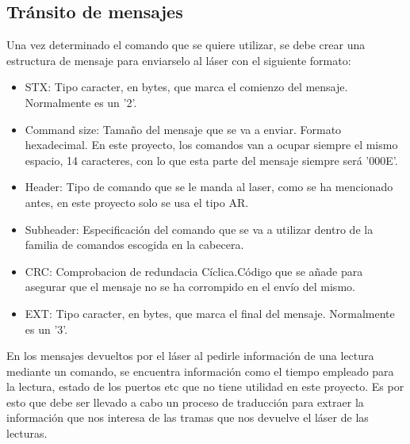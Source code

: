 \subsection{Tránsito de mensajes}
Una vez determinado el comando que se quiere utilizar, se debe crear una estructura de mensaje para enviarselo al láser con el siguiente formato:
\begin{itemize}
	\item STX: Tipo caracter, en bytes, que marca el comienzo del mensaje. Normalmente es un '2'.
 	\item Command size: Tamaño del mensaje que se va a enviar. Formato hexadecimal. En este proyecto, los comandos van a ocupar siempre el mismo espacio, 14 caracteres, con lo que esta parte del mensaje siempre será '000E'.
 	\item Header: Tipo de comando que se le manda al laser, como se ha mencionado antes, en este proyecto solo se usa el tipo AR.
 	\item Subheader: Especificación del comando que se va a utilizar dentro de la familia de comandos escogida en la cabecera.
 	\item CRC:  Comprobacion de redundacia Cíclica.Código que se añade para asegurar que el mensaje no se ha corrompido en el envío del mismo. 
 	\item EXT: Tipo caracter, en bytes, que marca el final del mensaje. Normalmente es un '3'.
 \end{itemize}

En los mensajes devueltos por el láser al pedirle información de una lectura mediante un comando, se encuentra información como el tiempo empleado para la lectura, estado de los puertos etc que no tiene utilidad en este proyecto. Es por esto que debe ser llevado a cabo un proceso de traducción para extraer la información que nos interesa de las tramas que nos devuelve el láser de las lecturas.




